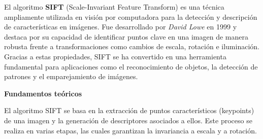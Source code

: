 \documentclass[a4paper]{article}
\begin{document}
  El algoritmo \textbf{SIFT} (Scale-Invariant Feature Transform) es una técnica ampliamente utilizada en visión por computadora para la detección y descripción de características en imágenes. Fue desarrollado por \textit{David Lowe} en 1999 y destaca por su capacidad de identificar puntos clave en una imagen de manera robusta frente a transformaciones como cambios de escala, rotación e iluminación. Gracias a estas propiedades, SIFT se ha convertido en una herramienta fundamental para aplicaciones como el reconocimiento de objetos, la detección de patrones y el emparejamiento de imágenes.
  \par\vspace{0.5cm}
  \textbf{Fundamentos teóricos}
  \par\vspace{0.5cm}
  
  El algoritmo SIFT se basa en la extracción de puntos característicos (keypoints) de una imagen y la generación de descriptores asociados a ellos. Este proceso se realiza en varias etapas, las cuales garantizan la invariancia a escala y a rotación.
  
\end{document}
